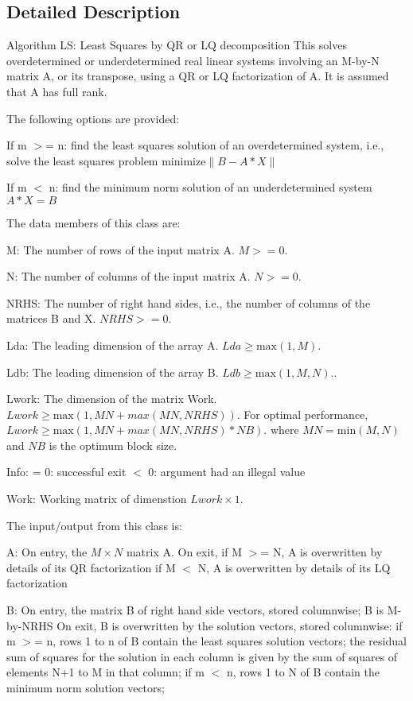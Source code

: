 \subsection{Detailed Description}
Algorithm L\+S\+: Least Squares by Q\+R or L\+Q decomposition This solves overdetermined or underdetermined real linear systems involving an M-\/by-\/\+N matrix A, or its transpose, using a Q\+R or L\+Q factorization of A. It is assumed that A has full rank.

The following options are provided\+:


\begin{DoxyEnumerate}
\item If m $>$= n\+: find the least squares solution of an overdetermined system, i.\+e., solve the least squares problem $ \mbox {minimize} \| B - A*X \| $
\item If m $<$ n\+: find the minimum norm solution of an underdetermined system $ A * X = B $
\end{DoxyEnumerate}

The data members of this class are\+:


\begin{DoxyItemize}
\item M\+: The number of rows of the input matrix A. $ M >= 0 $.
\item N\+: The number of columns of the input matrix A. $ N >= 0 $.
\item N\+R\+H\+S\+: The number of right hand sides, i.\+e., the number of columns of the matrices B and X. $ NRHS >=0 $.
\item Lda\+: The leading dimension of the array A. $ Lda \geq \mbox{max}(1,M) $.
\item Ldb\+: The leading dimension of the array B. $ Ldb \geq \mbox{max}(1,M,N). $.
\item Lwork\+: The dimension of the matrix Work. $ Lwork \geq \mbox{max}( 1, MN + max( MN, NRHS ) )$. For optimal performance, $ Lwork \geq \mbox{max}( 1, MN + max( MN, NRHS )*NB )$. where $ MN = \mbox{min}(M,N) $ and $ NB $ is the optimum block size.
\item Info\+: = 0\+: successful exit $<$ 0\+: argument had an illegal value
\item Work\+: Working matrix of dimenstion $ Lwork \times 1 $.
\end{DoxyItemize}

The input/output from this class is\+:
\begin{DoxyItemize}
\item A\+: On entry, the $ M \times N $ matrix A. On exit, if M $>$= N, A is overwritten by details of its Q\+R factorization if M $<$ N, A is overwritten by details of its L\+Q factorization
\item B\+: On entry, the matrix B of right hand side vectors, stored columnwise; B is M-\/by-\/\+N\+R\+H\+S On exit, B is overwritten by the solution vectors, stored columnwise\+: if m $>$= n, rows 1 to n of B contain the least squares solution vectors; the residual sum of squares for the solution in each column is given by the sum of squares of elements N+1 to M in that column; if m $<$ n, rows 1 to N of B contain the minimum norm solution vectors;
\end{DoxyItemize}

